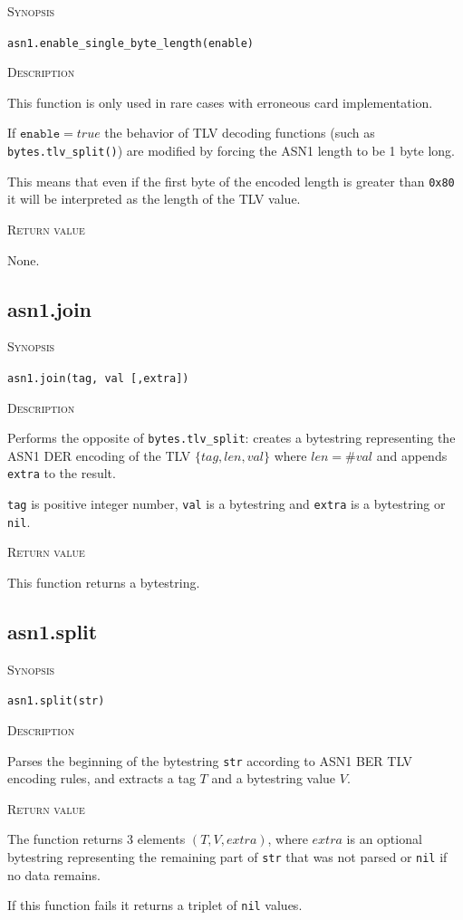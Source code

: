 \documentclass[11pt]{report}
\newcommand{\mansection}[1]{\vspace{0.5em}\par\noindent\textsc{#1}\vspace{0.5em}\par}
\begin{document}
\mansection{Synopsis}
\texttt{asn1.enable\_single\_byte\_length(enable)}

\mansection{Description}
  This function is only used in rare cases with erroneous card implementation.
  
  If $\texttt{enable}=true$ the behavior of TLV decoding functions 
  (such as \texttt{bytes.tlv\_split()}) are modified by forcing the ASN1 
  length to be 1 byte long. 
  
  This means that even if the first byte of the encoded length is greater 
  than \texttt{0x80} it will be interpreted as the length of the TLV value.

\mansection{Return value}
  None.

\subsection{asn1.join}

\mansection{Synopsis}
\texttt{asn1.join(tag, val [,extra])}

\mansection{Description}
  Performs the opposite of \texttt{bytes.tlv\_split}: creates a bytestring 
  representing the ASN1 DER encoding of the TLV $\{tag,len,val\}$ where $len=\#val$ 
  and appends \texttt{extra} to the result.

  \texttt{tag} is positive integer number, \texttt{val} is a bytestring and 
  \texttt{extra} is a bytestring or \texttt{nil}.

\mansection{Return value}
  This function returns a bytestring.

\subsection{asn1.split}

\mansection{Synopsis}
\texttt{asn1.split(str)}

\mansection{Description}
  Parses the beginning of the bytestring \texttt{str} according to ASN1 BER 
  TLV encoding rules, and extracts a tag $T$ and a bytestring value $V$.

\mansection{Return value}
  The function returns 3 elements $(T, V, extra)$, 
  where $extra$ is an optional bytestring representing the remaining part of 
  \texttt{str} that was not parsed or \texttt{nil} if no data remains.

  If this function fails it returns a triplet of \texttt{nil} values.
\end{document}
